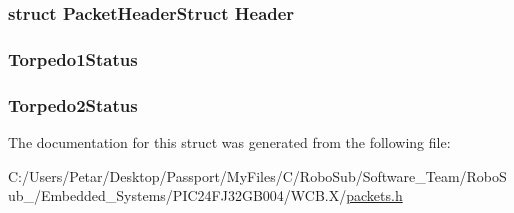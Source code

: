 \subsubsection[{Header}]{\setlength{\rightskip}{0pt plus 5cm}struct {\bf Packet\+Header\+Struct} Header}\label{struct_packet_torpedo_get_struct_ab201af50281aff5ed4f984f994938007}
\hypertarget{struct_packet_torpedo_get_struct_a047f48c23ea1e57620a92bd0b2fefa5d}{}
\subsubsection[{Torpedo1\+Status}]{ Torpedo1\+Status}\label{struct_packet_torpedo_get_struct_a047f48c23ea1e57620a92bd0b2fefa5d}
\hypertarget{struct_packet_torpedo_get_struct_a70ca44ad881c12b1a1ef7ebb7edbe057}{}
\subsubsection[{Torpedo2\+Status}]{ Torpedo2\+Status}\label{struct_packet_torpedo_get_struct_a70ca44ad881c12b1a1ef7ebb7edbe057}


The documentation for this struct was generated from the following file\+:\begin{DoxyCompactItemize}
\item 
C\+:/\+Users/\+Petar/\+Desktop/\+Passport/\+My\+Files/\+C/\+Robo\+Sub/\+Software\+\_\+\+Team/\+Robo\+Sub\+\_/\+Embedded\+\_\+\+Systems/\+P\+I\+C24\+F\+J32\+G\+B004/\+W\+C\+B.\+X/\hyperlink{_w_c_b_8_x_2packets_8h}{packets.\+h}\end{DoxyCompactItemize}
